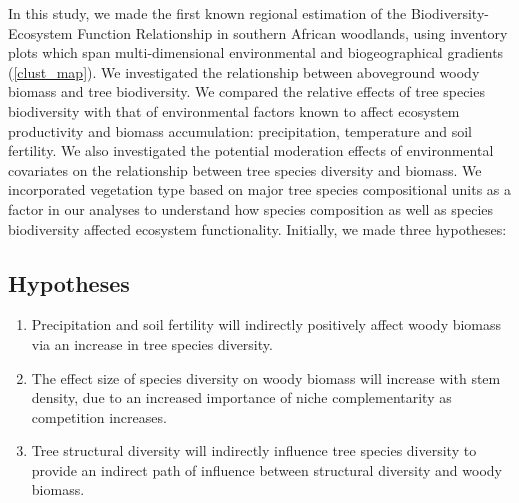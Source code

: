 \documentclass[11pt,a4paper]{article}
\begin{document}

In this study, we made the first known regional estimation of the Biodiversity-Ecosystem Function Relationship in southern African woodlands, using inventory plots which span multi-dimensional environmental and biogeographical gradients (\autoref{clust_map}). We investigated the relationship between aboveground woody biomass and tree biodiversity. We compared the relative effects of tree species biodiversity with that of environmental factors known to affect ecosystem productivity and biomass accumulation: precipitation, temperature and soil fertility. We also investigated the potential moderation effects of environmental covariates on the relationship between tree species diversity and biomass. We incorporated vegetation type based on major tree species compositional units as a factor in our analyses to understand how species composition as well as species biodiversity affected ecosystem functionality. Initially, we made three hypotheses: 

\subsection{Hypotheses}

\begin{enumerate}
	\item{Precipitation and soil fertility will indirectly positively affect woody biomass via an increase in tree species diversity.}
	\item{The effect size of species diversity on woody biomass will increase with stem density, due to an increased importance of niche complementarity as competition increases.}
	\item{Tree structural diversity will indirectly influence tree species diversity to provide an indirect path of influence between structural diversity and woody biomass.} \label{lst:num}
\end{enumerate}
\end{document}
